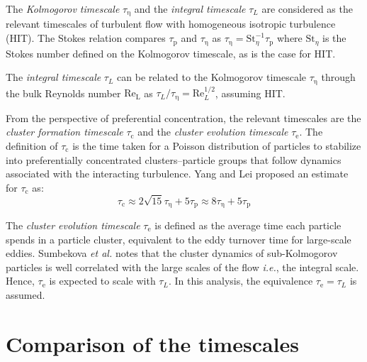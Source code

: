 \documentclass[authoryear,preprint,review,12pt]{elsarticle}
\newcommand{\mrm}[1]{\mathrm{#1}}
\newcommand{\taup}{\tau_\mathrm{p}}
\newcommand{\tauc}{\tau_\mathrm{c}}
\newcommand{\taue}{\tau_\mathrm{e}}
\newcommand{\tauk}{\tau_\mathrm{\eta}}
\newcommand{\tauL}{\tau_L}
\begin{document}
The \textit{Kolmogorov timescale} $\tauk$ and the \textit{integral timescale} $\tauL$ are considered as the relevant timescales of turbulent flow with homogeneous isotropic turbulence (HIT). The Stokes relation compares $\taup$ and $\tauk$ as $\tauk = \mrm{St}_\eta^{-1}\taup$ where $\mrm{St}_\eta$ is the Stokes number defined on the Kolmogorov timescale, as is the case for HIT.

The \textit{integral timescale} $\tauL$ can be related to the Kolmogorov timescale $\tauk$ through the bulk Reynolds number $\mrm{Re}_\mrm{L}$ as $\tauL/\tauk = \mrm{Re}_{L}^{1/2}$, assuming HIT.

From the perspective of preferential concentration, the relevant timescales are the \textit{cluster formation timescale} $\tauc$ and the \textit{cluster evolution timescale} $\taue$. The definition of $\tauc$ is the time taken for a Poisson distribution of particles to stabilize into preferentially concentrated clusters--particle groups that follow dynamics associated with the interacting turbulence.  Yang and Lei \cite{Yang1998} proposed an estimate for $\tauc$ as:
\begin{equation}
    \tauc \approx 2\sqrt{15}\tauk + 5 \taup \approx 8 \tauk + 5 \taup \label{eq:tauc}
\end{equation}

The \textit{cluster evolution timescale} $\taue$ is defined as the average time each particle spends in a particle cluster, equivalent to the eddy turnover time for large-scale eddies. Sumbekova \emph{et al.} \cite{Sumbekova} notes that the cluster dynamics of sub-Kolmogorov particles is well correlated with the large scales of the flow \emph{i.e.}, the integral scale. Hence, $\taue$ is expected to scale with $\tauL$. In this analysis, the equivalence $\taue = \tauL$ is assumed.

\section{Comparison of the timescales}
\end{document}
